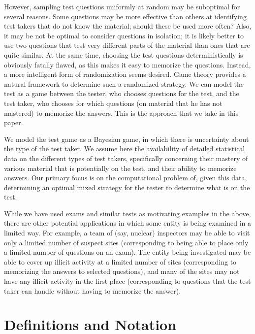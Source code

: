 \documentclass{article}
\begin{document}
However, sampling test questions uniformly at random may be suboptimal
for several reasons.  Some questions may be more effective than others
at identifying test takers that do not know the material; should these
be used more often?  Also, it may be not be optimal to consider
questions in isolation; it is likely better to use two questions that
test very different parts of the material than ones that are quite
similar.  At the same time, choosing the test questions
deterministically is obviously fatally flawed, as this makes it easy
to memorize the questions.  Instead, a more intelligent form of
randomization seems desired.  Game theory provides a natural framework
to determine such a randomized strategy.  We can model the test as a
game between the tester, who chooses questions for the test, and the
test taker, who chooses for which questions (on material that he has
not mastered) to memorize the answers.  This is the approach that we
take in this paper.

We model the test game as a Bayesian game, in which there is
uncertainty about the type of the test taker.
We assume here the availability of detailed statistical data on the
different types of test takers, specifically concerning their mastery
of various material that is potentially on the test, and their ability
to memorize answers.  Our primary focus is on the computational
problem of, given this data, determining an optimal mixed strategy for
the tester to determine what is on the test.

While we have used exams and similar tests as motivating examples in
the above, there are other potential applications in which some entity
is being examined in a limited way.  For example, a team of (say,
nuclear) inspectors may be able to visit only a limited number of
suspect sites (corresponding to being able to place only a limited
number of questions on an exam).  The entity being investigated may be
able to cover up illicit activity at a limited number of sites
(corresponding to memorizing the answers to selected questions), and
many of the sites may not have any illicit activity in the first place
(corresponding to questions that the test taker can handle without
having to memorize the answer).

\section{Definitions and Notation}

\end{document}
